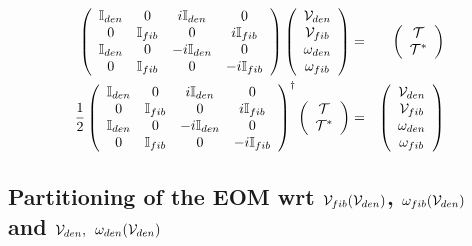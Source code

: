\begin{eqnarray}
\left( 
\begin{array}{cccc}
{\Bbb I}_{den} & 0 & i{\Bbb I}_{den} & 0 \\ 
0 & {\Bbb I}_{fib} & 0 & i{\Bbb I}_{fib} \\ 
{\Bbb I}_{den} & 0 & -i{\Bbb I}_{den} & 0 \\ 
0 & {\Bbb I}_{fib} & 0 & -i{\Bbb I}_{fib}%
\end{array}%
\right) \left( 
\begin{array}{c}
{\cal V}_{den} \\ 
{\cal V}_{fib} \\ 
{\cal \omega }_{den} \\ 
{\cal \omega }_{fib}%
\end{array}%
\right) &=&\left( 
\begin{array}{c}
{\cal T} \\ 
{\cal T}^{\ast }%
\end{array}%
\right) \\
\frac{1}{2}\left( 
\begin{array}{cccc}
{\Bbb I}_{den} & 0 & i{\Bbb I}_{den} & 0 \\ 
0 & {\Bbb I}_{fib} & 0 & i{\Bbb I}_{fib} \\ 
{\Bbb I}_{den} & 0 & -i{\Bbb I}_{den} & 0 \\ 
0 & {\Bbb I}_{fib} & 0 & -i{\Bbb I}_{fib}%
\end{array}%
\right) ^{\dagger }\left( 
\begin{array}{c}
{\cal T} \\ 
{\cal T}^{\ast }%
\end{array}%
\right) &=&\left( 
\begin{array}{c}
{\cal V}_{den} \\ 
{\cal V}_{fib} \\ 
{\cal \omega }_{den} \\ 
{\cal \omega }_{fib}%
\end{array}%
\right)
\end{eqnarray}

\subsection{Partitioning of the EOM wrt ${\cal V}_{fib}({\cal V}_{den})$, $%
\protect\omega _{fib}({\cal V}_{den})$ and ${\cal V}_{den},$ $\protect\omega %
_{den}({\cal V}_{den})$}

